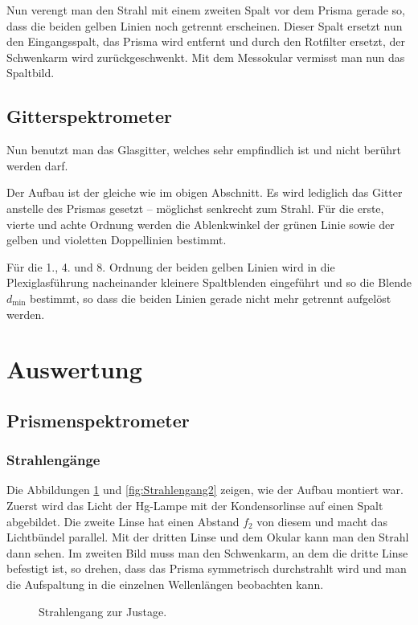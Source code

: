 \documentclass[12pt,a4paper,titlepage,headinclude,bibtotoc]{scrartcl}
\begin{document}
Nun verengt man den Strahl mit einem zweiten Spalt vor dem Prisma gerade so, dass die beiden gelben Linien noch getrennt erscheinen.
Dieser Spalt ersetzt nun den Eingangsspalt, das Prisma wird entfernt und durch den Rotfilter ersetzt, der Schwenkarm wird zurückgeschwenkt.
Mit dem Messokular vermisst man nun das Spaltbild.

\subsection{Gitterspektrometer}
Nun benutzt man das Glasgitter, welches sehr empfindlich ist und nicht berührt werden darf.

Der Aufbau ist der gleiche wie im obigen Abschnitt.
Es wird lediglich das Gitter anstelle des Prismas gesetzt -- möglichst senkrecht zum Strahl.
Für die erste, vierte und achte Ordnung werden die Ablenkwinkel der grünen Linie sowie der gelben und violetten Doppellinien bestimmt.

Für die 1., 4. und 8. Ordnung der beiden gelben Linien wird in die Plexiglasführung nacheinander kleinere Spaltblenden eingeführt und so die Blende $d_\text{min}$ bestimmt, so dass die beiden Linien gerade nicht mehr getrennt aufgelöst werden.

\section{Auswertung}
\label{sec:auswertung}

\subsection{Prismenspektrometer}
\subsubsection{Strahlengänge}
Die Abbildungen \ref{fig:Strahlengang1} und \ref{fig:Strahlengang2} zeigen, wie der Aufbau montiert war.
Zuerst wird das Licht der Hg-Lampe mit der Kondensorlinse auf einen Spalt abgebildet.
Die zweite Linse hat einen Abstand $f_2$ von diesem und macht das Lichtbündel parallel.
Mit der dritten Linse und dem Okular kann man den Strahl dann sehen.
Im zweiten Bild muss man den Schwenkarm, an dem die dritte Linse befestigt ist, so drehen, dass das Prisma symmetrisch durchstrahlt wird und man die Aufspaltung in die einzelnen Wellenlängen beobachten kann.

\begin{figure}[!htb]
	\def\svgwidth{0.8\linewidth}	
	
	\caption{Strahlengang zur Justage. \protect \footnotemark}
	\label{fig:Strahlengang1}	
\end{figure}
\end{document}
